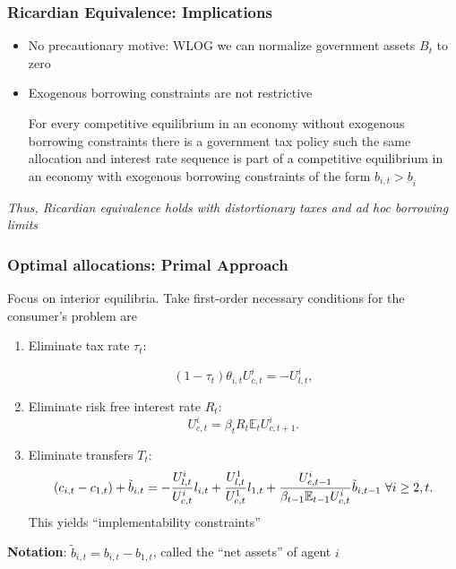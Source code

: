 \documentclass{beamer}
\begin{document}
\begin{frame}
 \frametitle{Ricardian Equivalence: Implications}
 \begin{itemize}
 \item No precautionary motive: WLOG  we can normalize government assets $B_t$ to zero
  \item Exogenous borrowing constraints are not restrictive
\begin{theorem}
 For every  competitive
equilibrium   in an economy without
exogenous borrowing constraints there is a government tax policy such the same allocation and interest rate sequence is  part of a competitive equilibrium
in an economy with exogenous borrowing constraints of the form $b_{i,t}>\underbar{b}_i$
\end{theorem}
  \end{itemize}

  \color{red}\emph{Thus, Ricardian equivalence holds with distortionary taxes and ad hoc borrowing limits}

\end{frame}


\begin{frame}
 \frametitle{Optimal allocations: Primal Approach}
Focus on  interior equilibria. Take first-order necessary conditions for the  consumer's problem
 are%

 \begin{enumerate}
  \item Eliminate tax rate $\tau_t$:

\begin{equation*}
\left( 1-\tau _{t}\right) \theta _{i,t}U_{c,t}^{i}=-U_{l,t}^{i},
\end{equation*}%
\item Eliminate risk free interest rate $R_t$:
\begin{equation*}
U_{c,t}^{i}=\beta_tR_{t}\mathbb{E}_{t}U_{c,t+1}^{i}.  \label{FOC Euler}
\end{equation*}%
\item Eliminate transfers $T_t$:
{\small
\begin{equation*}
\left( c_{i,t}-c_{1,t}\right) +\tilde{b}_{i,t} =-\frac{U_{l,t}^{i}}{U_{c,t}^{i}}l_{i,t}+\frac{U^1_{l,t}}{U^1_{c,t}}l_{1,t} +\frac{U_{c,t-1}^{i}}{\beta_{t-1} \mathbb{E}%
_{t-1}U_{c,t}^{i}}\tilde{b}_{i,t-1}\ \forall i\geq2,t.  \notag
\end{equation*} }
This yields ``implementability constraints''%
 \end{enumerate}
\textbf{Notation}: $\tilde{b}_{i,t}=b_{i,t}-b_{1,t}$, called  the ``net assets'' of agent $i$
\end{frame}
\end{document}
